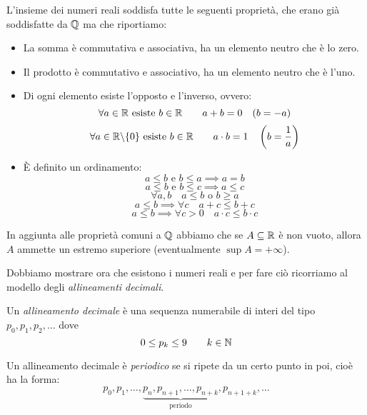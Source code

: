 L'insieme dei numeri reali soddisfa tutte le seguenti proprietà, che erano già soddisfatte da $\mathbb Q$ ma che riportiamo:
\begin{itemize}
\item La somma è commutativa e associativa, ha un elemento neutro che è lo zero.
\item Il prodotto è commutativo e associativo, ha un elemento neutro che è l'uno.
\item Di ogni elemento esiste l'opposto e l'inverso, ovvero:
\begin{equation}
\forall a \in \mathbb R \text{ esiste } b \in \mathbb R \qquad a + b = 0 \quad (b=-a)
\end{equation}
\begin{equation}
\forall a \in \mathbb R\backslash\{0\} \text{ esiste } b \in \mathbb R \qquad a\cdot b = 1 \quad \left(b=\frac{1}{a}\right)
\end{equation}
\item È definito un ordinamento:
\begin{equation}
a \le b \text{ e } b \le a \implies a = b
\end{equation}
\begin{equation}
a \le b \text{ e } b \le c \implies a \le c
\end{equation}
\begin{equation}
\forall a, b \quad a \le b \text{ o } b \ge a
\end{equation}
\begin{equation}
a \le b \implies \forall c \quad a + c \le b + c
\end{equation}
\begin{equation}
a \le b \implies \forall c > 0 \quad a \cdot c \le b \cdot c
\end{equation}
\end{itemize}

In aggiunta alle proprietà comuni a $\mathbb Q$ abbiamo che se $A \subseteq \mathbb R$ è non vuoto, allora $A$ ammette un estremo superiore (eventualmente $\sup  A = +\infty$).

Dobbiamo mostrare ora che esistono i numeri reali e per fare ciò ricorriamo al modello degli \emph{allineamenti decimali}.

Un \emph{allineamento decimale} è una sequenza numerabile di interi del tipo $p_0, p_1, p_2, \ldots $ dove
\begin{equation}
0 \le p_k \le 9 \qquad k \in \mathbb N
\end{equation}

Un allineamento decimale è \emph{periodico} se si ripete da un certo punto in poi, cioè ha la forma:
\begin{equation}
p_0, p_1, \ldots, \underbrace{p_n, p_{n+1}, \ldots, p_{n+k}}_{\text{periodo}}, p_{n+1+k}, \ldots
\end{equation}

